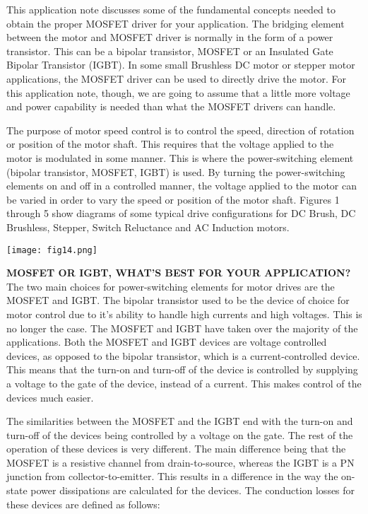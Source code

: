 \documentclass[11pt]{article}
\begin{document}
 This application note discusses some of the fundamental concepts needed to obtain the proper MOSFET driver for your application. \newline
The bridging element between the motor and MOSFET driver is normally in the form of a power transistor. This can be a bipolar transistor, MOSFET or an Insulated Gate Bipolar Transistor (IGBT). In some small Brushless DC motor or stepper motor applications, the MOSFET driver can be used to directly drive the motor. For this application note, though, we are going to assume that a little more voltage and power capability is needed than what the MOSFET drivers can handle.\newline

The purpose of motor speed control is to control the speed, direction of rotation or position of the motor shaft. This requires that the voltage applied to the motor is modulated in some manner. This is where the power-switching element (bipolar transistor, MOSFET, IGBT) is used. By turning the power-switching elements on and off in a controlled manner, the voltage applied to the motor can be varied in order to vary the speed or position of the motor shaft. Figures 1 through 5 show diagrams of some typical drive configurations for DC Brush, DC Brushless, Stepper, Switch Reluctance and AC Induction motors.\newline

\begin {center}
\texttt{[image: fig14.png]}\newline
\end{center}
\textbf {MOSFET OR IGBT, WHAT’S BEST FOR YOUR APPLICATION?}
The two main choices for power-switching elements for motor drives are the MOSFET and IGBT. The bipolar transistor used to be the device of choice for motor control due to it’s ability to handle high currents and high voltages. This is no longer the case. The MOSFET and IGBT have taken over the majority of the applications. Both the MOSFET and IGBT devices are voltage controlled devices, as opposed to the bipolar transistor, which is a current-controlled device. This means that the turn-on and turn-off of the device is controlled by supplying a voltage to the gate of the device, instead of a current. This makes control of the devices much easier.\newline

The similarities between the MOSFET and the IGBT end with the turn-on and turn-off of the devices being controlled by a voltage on the gate. The rest of the operation of these devices is very different. The main difference being that the MOSFET is a resistive channel from drain-to-source, whereas the IGBT is a PN junction from collector-to-emitter. This results in a difference in the way the on-state power dissipations are calculated for the devices. The conduction losses for these devices are defined as follows:\newline
\end{document}
